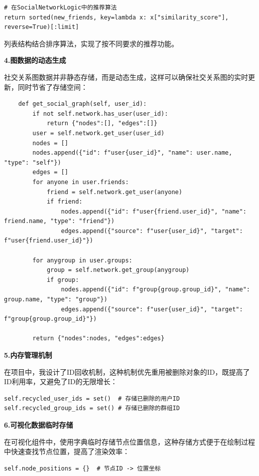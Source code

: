 \documentclass[12pt,a4paper]{article}
\begin{document}
\begin{verbatim}
# 在SocialNetworkLogic中的推荐算法
return sorted(new_friends, key=lambda x: x["similarity_score"], reverse=True)[:limit]
\end{verbatim}

列表结构结合排序算法，实现了按不同要求的推荐功能。

\noindent\textbf{4.图数据的动态生成}

社交关系图数据并非静态存储，而是动态生成，这样可以确保社交关系图的实时更新，同时节省了存储空间：

\tiny\begin{verbatim}
    def get_social_graph(self, user_id):
        if not self.network.has_user(user_id):
            return {"nodes":[], "edges":[]}
        user = self.network.get_user(user_id)
        nodes = []
        nodes.append({"id": f"user{user_id}", "name": user.name, "type": "self"})
        edges = []
        for anyone in user.friends:
            friend = self.network.get_user(anyone)
            if friend:
                nodes.append({"id": f"user{friend.user_id}", "name": friend.name, "type": "friend"})
                edges.append({"source": f"user{user_id}", "target": f"user{friend.user_id}"})

        for anygroup in user.groups:
            group = self.network.get_group(anygroup)
            if group:
                nodes.append({"id": f"group{group.group_id}", "name": group.name, "type": "group"})
                edges.append({"source": f"user{user_id}", "target": f"group{group.group_id}"})

        return {"nodes":nodes, "edges":edges}
\end{verbatim}
\normalsize 
\noindent\textbf{5.内存管理机制}

在项目中，我设计了ID回收机制，这种机制优先重用被删除对象的ID，既提高了ID利用率，又避免了ID的无限增长：

\begin{verbatim}
self.recycled_user_ids = set()  # 存储已删除的用户ID
self.recycled_group_ids = set() # 存储已删除的群组ID
\end{verbatim}

\noindent\textbf{6.可视化数据临时存储}

在可视化组件中，使用字典临时存储节点位置信息，这种存储方式便于在绘制过程中快速查找节点位置，提高了渲染效率：

\begin{verbatim}
self.node_positions = {}  # 节点ID -> 位置坐标
\end{verbatim}
\end{document}
